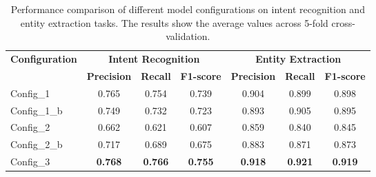 \begin{table}[H]
\caption{Performance comparison of different model configurations on intent recognition and entity extraction tasks. The results show the average values across 5-fold cross-validation.}
\label{tab:performance_comparison}
\centering
\begin{tabular}{lcccccc}
\toprule
\multirow{2}{*}{\textbf{Configuration}} & \multicolumn{3}{c}{\textbf{Intent Recognition}} & \multicolumn{3}{c}{\textbf{Entity Extraction}} \\
\cmidrule(lr){2-4} \cmidrule(lr){5-7}
 & \textbf{Precision} & \textbf{Recall} & \textbf{F1-score} & \textbf{Precision} & \textbf{Recall} & \textbf{F1-score} \\
\midrule
Config\_1 & 0.765 & 0.754 & 0.739 & 0.904 & 0.899 & 0.898 \\
Config\_1\_b & 0.749 & 0.732 & 0.723 & 0.893 & 0.905 & 0.895 \\
Config\_2 & 0.662 & 0.621 & 0.607 & 0.859 & 0.840 & 0.845 \\
Config\_2\_b & 0.717 & 0.689 & 0.675 & 0.883 & 0.871 & 0.873 \\
Config\_3 & \textbf{0.768} & \textbf{0.766} & \textbf{0.755} & \textbf{0.918} & \textbf{0.921} & \textbf{0.919} \\
\bottomrule
\end{tabular}
\end{table}


